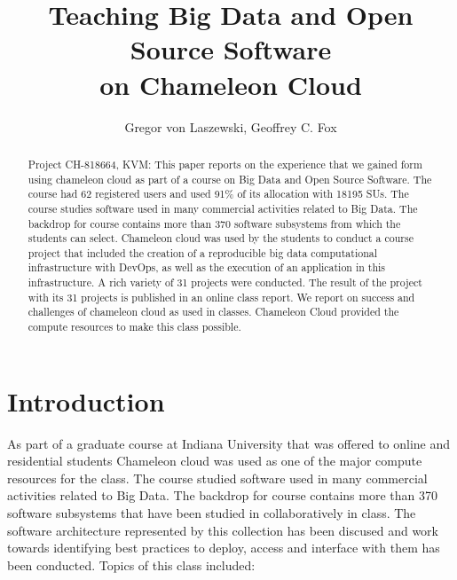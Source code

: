 \documentclass[sigconf]{acmart}
\begin{document}
\title{Teaching Big Data and Open Source Software\\
  on Chameleon Cloud}


\author{Gregor von Laszewski, Geoffrey C. Fox}


\begin{abstract}
  Project CH-818664, KVM: This paper reports on the experience that we
  gained form using chameleon cloud as part of a course on Big Data
  and Open Source Software. The course had 62 registered users and
  used 91\% of its allocation with 18195 SUs. The course studies
  software used in many commercial activities related to Big Data. The
  backdrop for course contains more than 370 software subsystems from
  which the students can select. Chameleon cloud was used by the
  students to conduct a course project that included the creation of a
  reproducible big data computational infrastructure with DevOps, as
  well as the execution of an application in this infrastructure. A
  rich variety of 31 projects were conducted. The result of the
  project with its 31 projects is published in an online class
  report. We report on success and challenges of chameleon cloud as
  used in classes. Chameleon Cloud provided the compute resources to
  make this class possible.
\end{abstract}



\maketitle

\section{Introduction}

As part of a graduate course at Indiana University that was offered to
online and residential students Chameleon cloud was used as one of the
major compute resources for the class. The course studied software
used in many commercial activities related to Big Data. The backdrop
for course contains more than 370 software subsystems that have been
studied in collaboratively in class. The software
architecture represented by this collection has been discused and work
towards identifying best practices to deploy, access and interface
with them has been conducted. Topics of this class included:
\end{document}
